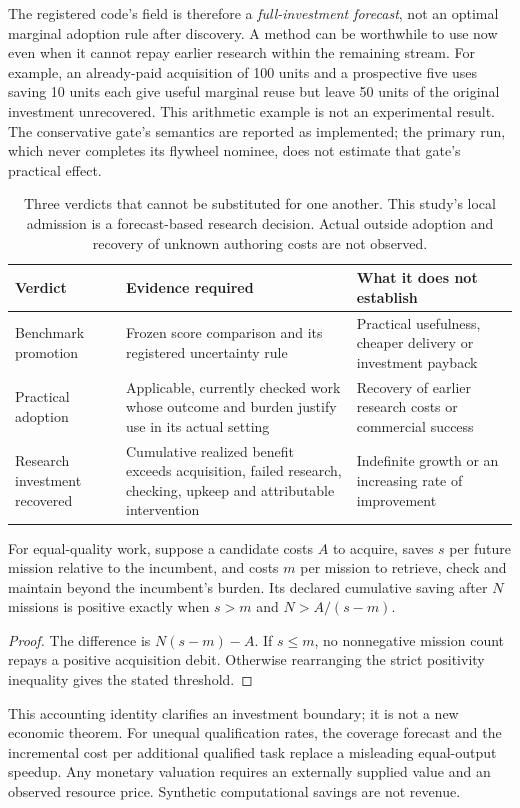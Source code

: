The registered code's  field is therefore a \emph{full-investment forecast}, not an optimal marginal adoption rule after discovery. A method can be worthwhile to use now even when it cannot repay earlier research within the remaining stream. For example, an already-paid acquisition of 100 units and a prospective five uses saving 10 units each give useful marginal reuse but leave 50 units of the original investment unrecovered. This arithmetic example is not an experimental result. The conservative gate's semantics are reported as implemented; the primary run, which never completes its flywheel nominee, does not estimate that gate's practical effect.

\begin{table}[ht]\centering\small
\begin{tabularx}{\linewidth}{L{33mm}YY}
\toprule
Verdict & Evidence required & What it does not establish \\
\midrule
Benchmark promotion & Frozen score comparison and its registered uncertainty rule & Practical usefulness, cheaper delivery or investment payback \\
Practical adoption & Applicable, currently checked work whose outcome and burden justify use in its actual setting & Recovery of earlier research costs or commercial success \\
Research investment recovered & Cumulative realized benefit exceeds acquisition, failed research, checking, upkeep and attributable intervention & Indefinite growth or an increasing rate of improvement \\
\bottomrule
\end{tabularx}
\caption{Three verdicts that cannot be substituted for one another. This study's local admission is a forecast-based research decision. Actual outside adoption and recovery of unknown authoring costs are not observed.}
\end{table}

\begin{proposition}
For equal-quality work, suppose a candidate costs $A$ to acquire, saves $s$ per future mission relative to the incumbent, and costs $m$ per mission to retrieve, check and maintain beyond the incumbent's burden. Its declared cumulative saving after $N$ missions is positive exactly when $s>m$ and $N>A/(s-m)$.
\end{proposition}
\begin{proof}
The difference is $N(s-m)-A$. If $s\leq m$, no nonnegative mission count repays a positive acquisition debit. Otherwise rearranging the strict positivity inequality gives the stated threshold.
\end{proof}
This accounting identity clarifies an investment boundary; it is not a new economic theorem. For unequal qualification rates, the coverage forecast and the incremental cost per additional qualified task replace a misleading equal-output speedup. Any monetary valuation requires an externally supplied value and an observed resource price. Synthetic computational savings are not revenue.

